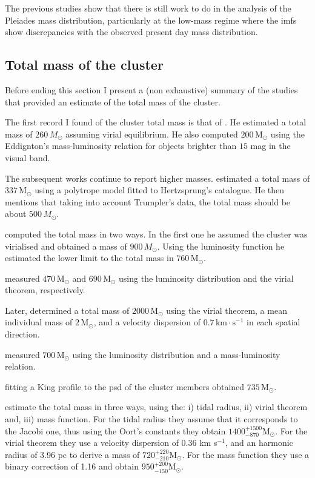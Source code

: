 The previous studies show that there is still work to do in the analysis of the Pleiades mass distribution, particularly at the low-mass regime where the \glspl{imf} show discrepancies with the observed present day mass distribution.  

\subsection{Total mass of the cluster}
Before ending this section I present a (non exhaustive) summary of the studies that provided an estimate of the total mass of the cluster.

The first record I found of the cluster total mass is that of \citet{1938AJ.....47...25T}. He estimated a total mass of $260 \,M_{\odot}$ assuming virial equilibrium. He also computed $200 \,\mathrm{M_{\odot}}$ using the Eddignton's mass-luminosity relation for objects brighter than $15$ mag in the visual band.

The subsequent works continue to report higher masses. \citet{1956MNRAS.116..296W} estimated a total mass of $337 \,\mathrm{M_{\odot}}$ using a polytrope model fitted to Hertzsprung's catalogue. He then mentions that taking into account Trumpler's data, the total mass should be about $500\,M_{\odot}$. 

\citet{Limber1962} computed the total mass in two ways. In the first one he assumed the cluster was virialised and obtained a mass of $900 \,M_{\odot}$. Using the luminosity function he estimated the lower limit to the total mass in $760 \,\mathrm{M_{\odot}}$. 

\citet{1970AJ.....75..563J} measured $470\,\mathrm{M_{\odot}}$ and $690\,\mathrm{M_{\odot}}$ using the luminosity distribution and the virial theorem, respectively. 

Later, \citet{1980IAUS...85..157V}  determined a total mass of $2000 \,\mathrm{M_{\odot}}$ using the virial theorem, a mean individual mass of $2\,\mathrm{M_{\odot}}$, and a velocity dispersion of $0.7\,\mathrm{km \cdot s^{-1}}$ in each spatial direction. 

\citet{1995JKAS...28...45L} measured $700 \,\mathrm{M_{\odot}}$ using the luminosity distribution and a mass-luminosity relation. 

\citet{Pinfield1998} fitting a King profile to the \gls{psd} of the cluster members obtained $735\,\mathrm{M_{\odot}}$. 

\citet{Raboud1998} estimate the total mass in three ways, using the: i) tidal radius, ii) virial theorem and, iii) mass function. For the tidal radius they assume that it corresponds to the Jacobi one, thus using the Oort's constants they obtain $1400_{-870}^{+1500}\mathrm{M_{\odot}}$. For the virial theorem they use a velocity dispersion of 0.36 km s$^{-1}$, and an harmonic radius of 3.96 pc to derive a mass of  $720_{-210}^{+220}\mathrm{M_{\odot}}$. For the mass function they use a binary correction of 1.16 and obtain $950_{-150}^{+200}\mathrm{M_{\odot}}$.

